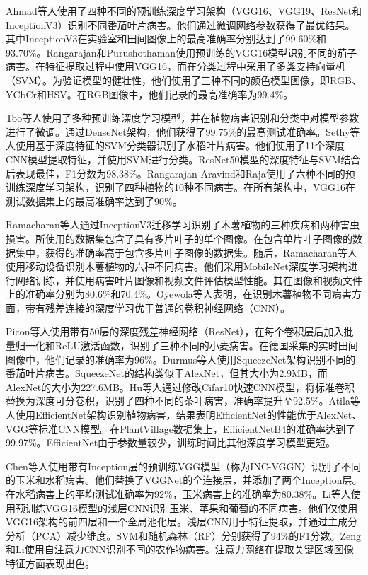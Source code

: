 Ahmad等人使用了四种不同的预训练深度学习架构（VGG16、VGG19、ResNet和InceptionV3）识别不同番茄叶片病害。他们通过微调网络参数获得了最优结果。其中InceptionV3在实验室和田间图像上的最高准确率分别达到了99.60\%和93.70\%。Rangarajan和Purushothaman使用预训练的VGG16模型识别不同的茄子病害。在特征提取过程中使用VGG16，而在分类过程中采用了多类支持向量机（SVM）。为验证模型的健壮性，他们使用了三种不同的颜色模型图像，即RGB、YCbCr和HSV。在RGB图像中，他们记录的最高准确率为99.4\%。

Too等人使用了多种预训练深度学习模型，并在植物病害识别和分类中对模型参数进行了微调。通过DenseNet架构，他们获得了99.75\%的最高测试准确率。Sethy等人使用基于深度特征的SVM分类器识别了水稻叶片病害。他们使用了11个深度CNN模型提取特征，并使用SVM进行分类。ResNet50模型的深度特征与SVM结合后表现最佳，F1分数为98.38\%。Rangarajan Aravind和Raja使用了六种不同的预训练深度学习架构，识别了四种植物的10种不同病害。在所有架构中，VGG16在测试数据集上的最高准确率达到了90\%。

Ramacharan等人通过InceptionV3迁移学习识别了木薯植物的三种疾病和两种害虫损害。所使用的数据集包含了具有多片叶子的单个图像。在包含单片叶子图像的数据集中，获得的准确率高于包含多片叶子图像的数据集。随后，Ramacharan等人使用移动设备识别木薯植物的六种不同病害。他们采用MobileNet深度学习架构进行网络训练，并使用病害叶片图像和视频文件评估模型性能。其在图像和视频文件上的准确率分别为80.6\%和70.4\%。Oyewola等人表明，在识别木薯植物不同病害方面，带有残差连接的深度学习优于普通的卷积神经网络（CNN）。

Picon等人使用带有50层的深度残差神经网络（ResNet），在每个卷积层后加入批量归一化和ReLU激活函数，识别了三种不同的小麦病害。在德国采集的实时田间图像中，他们记录的准确率为96\%。Durmus等人使用SqueezeNet架构识别不同的番茄叶片病害。SqueezeNet的结构类似于AlexNet，但其大小为2.9MB，而AlexNet的大小为227.6MB。Hu等人通过修改Cifar10快速CNN模型，将标准卷积替换为深度可分卷积，识别了四种不同的茶叶病害，准确率提升至92.5\%。Atila等人使用EfficientNet架构识别植物病害，结果表明EfficientNet的性能优于AlexNet、VGG等标准CNN模型。在PlantVillage数据集上，EfficientNetB4的准确率达到了99.97\%。EfficientNet由于参数量较少，训练时间比其他深度学习模型更短。

Chen等人使用带有Inception层的预训练VGG模型（称为INC-VGGN）识别了不同的玉米和水稻病害。他们替换了VGGNet的全连接层，并添加了两个Inception层。在水稻病害上的平均测试准确率为92\%，玉米病害上的准确率为80.38\%。Li等人使用预训练VGG16模型的浅层CNN识别玉米、苹果和葡萄的不同病害。他们仅使用VGG16架构的前四层和一个全局池化层。浅层CNN用于特征提取，并通过主成分分析（PCA）减少维度。SVM和随机森林（RF）分别获得了94\%的F1分数。Zeng和Li使用自注意力CNN识别不同的农作物病害。注意力网络在提取关键区域图像特征方面表现出色。

